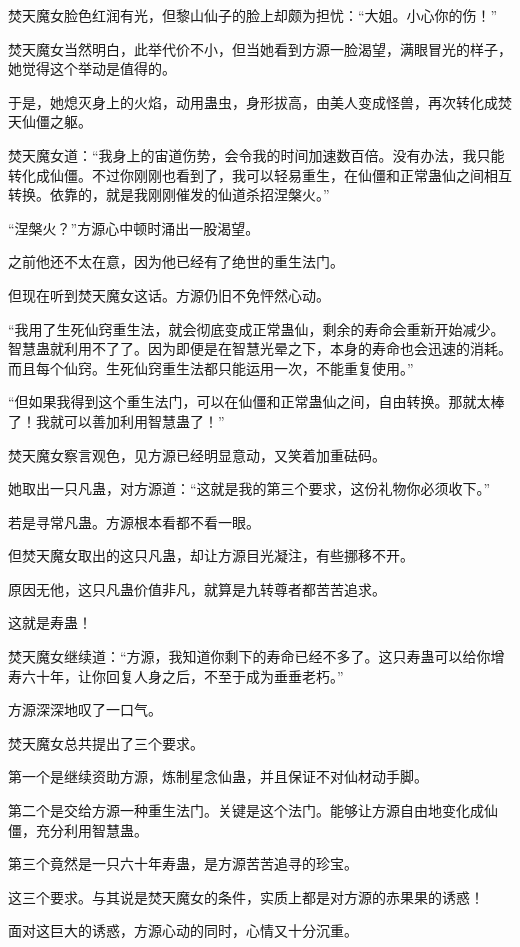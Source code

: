 \begin{this_body}
焚天魔女脸色红润有光，但黎山仙子的脸上却颇为担忧：“大姐。小心你的伤！”

焚天魔女当然明白，此举代价不小，但当她看到方源一脸渴望，满眼冒光的样子，她觉得这个举动是值得的。

于是，她熄灭身上的火焰，动用蛊虫，身形拔高，由美人变成怪兽，再次转化成焚天仙僵之躯。

焚天魔女道：“我身上的宙道伤势，会令我的时间加速数百倍。没有办法，我只能转化成仙僵。不过你刚刚也看到了，我可以轻易重生，在仙僵和正常蛊仙之间相互转换。依靠的，就是我刚刚催发的仙道杀招涅槃火。”

“涅槃火？”方源心中顿时涌出一股渴望。

之前他还不太在意，因为他已经有了绝世的重生法门。

但现在听到焚天魔女这话。方源仍旧不免怦然心动。

“我用了生死仙窍重生法，就会彻底变成正常蛊仙，剩余的寿命会重新开始减少。智慧蛊就利用不了了。因为即便是在智慧光晕之下，本身的寿命也会迅速的消耗。而且每个仙窍。生死仙窍重生法都只能运用一次，不能重复使用。”

“但如果我得到这个重生法门，可以在仙僵和正常蛊仙之间，自由转换。那就太棒了！我就可以善加利用智慧蛊了！”

焚天魔女察言观色，见方源已经明显意动，又笑着加重砝码。

她取出一只凡蛊，对方源道：“这就是我的第三个要求，这份礼物你必须收下。”

若是寻常凡蛊。方源根本看都不看一眼。

但焚天魔女取出的这只凡蛊，却让方源目光凝注，有些挪移不开。

原因无他，这只凡蛊价值非凡，就算是九转尊者都苦苦追求。

这就是寿蛊！

焚天魔女继续道：“方源，我知道你剩下的寿命已经不多了。这只寿蛊可以给你增寿六十年，让你回复人身之后，不至于成为垂垂老朽。”

方源深深地叹了一口气。

焚天魔女总共提出了三个要求。

第一个是继续资助方源，炼制星念仙蛊，并且保证不对仙材动手脚。

第二个是交给方源一种重生法门。关键是这个法门。能够让方源自由地变化成仙僵，充分利用智慧蛊。

第三个竟然是一只六十年寿蛊，是方源苦苦追寻的珍宝。

这三个要求。与其说是焚天魔女的条件，实质上都是对方源的赤果果的诱惑！

面对这巨大的诱惑，方源心动的同时，心情又十分沉重。


\end{this_body}
